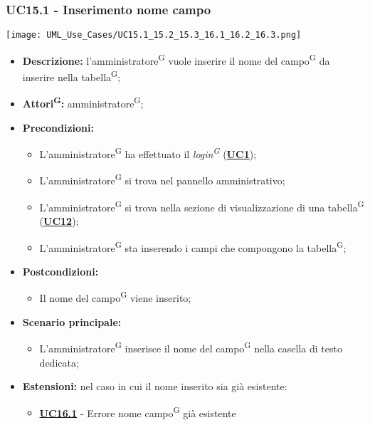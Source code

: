 \subsubsection{UC15.1 - Inserimento nome campo}
\label{sec:UC15.1}
\texttt{[image: UML\_Use\_Cases/UC15.1\_15.2\_15.3\_16.1\_16.2\_16.3.png]}
\begin{itemize}
	\item \textbf{Descrizione:} l’amministratore\textsuperscript{G} vuole inserire il nome del campo\textsuperscript{G} da inserire nella tabella\textsuperscript{G};
	\item \textbf{Attori\textsuperscript{G}:} amministratore\textsuperscript{G};
	\item \textbf{Precondizioni:} 
	\begin{itemize}
		\item L’amministratore\textsuperscript{G} ha effettuato il \textit{login\textsuperscript{G}} (\hyperref[sec:UC1]{\textbf{UC1}});
		\item L’amministratore\textsuperscript{G} si trova nel pannello amministrativo;
		\item L’amministratore\textsuperscript{G} si trova nella sezione di visualizzazione di una tabella\textsuperscript{G} (\hyperref[sec:UC12]{\textbf{UC12}});
		\item L’amministratore\textsuperscript{G} sta inserendo i campi che compongono la tabella\textsuperscript{G};
	\end{itemize}
	\item \textbf{Postcondizioni:} 
	\begin{itemize}
		\item Il nome del campo\textsuperscript{G} viene inserito;
	\end{itemize}
	\item \textbf{Scenario principale:} 
	\begin{itemize}
		\item L’amministratore\textsuperscript{G} inserisce il nome del campo\textsuperscript{G} nella casella di testo dedicata;
	\end{itemize}
	\item \textbf{Estensioni:} nel caso in cui il nome inserito sia già esistente:
	\begin{itemize}
		\item \hyperref[sec:UC16.1]{\textbf{UC16.1}} - Errore nome campo\textsuperscript{G} già esistente
	\end{itemize}
\end{itemize}

